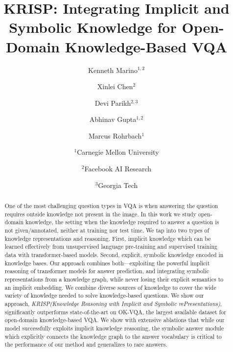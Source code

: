 \documentclass[final]{cvpr}
\providecommand{\ModelName}{KRISP\xspace}
\providecommand{\ModelNameLong}{Knowledge Reasoning with Implicit and  Symbolic rePresentations\xspace}
\providecommand{\sectionvspace}{\vspace{-0cm}}
\begin{document}
\title{KRISP: Integrating Implicit and Symbolic Knowledge for Open-Domain Knowledge-Based VQA}

\author{Kenneth Marino$^{1,2}$ \hspace{-.4cm} \\
\and
Xinlei Chen$^2$ \hspace{-.4cm} \\
\and
Devi Parikh$^{2,3}$ \hspace{-.4cm}\\
\and
Abhinav Gupta$^{1,2}$ \hspace{-.4cm}\\
\and
Marcus Rohrbach$^1$\\
\and
$^1$Carnegie Mellon University
\and
$^2$Facebook AI Research
\and
$^3$Georgia Tech
}
\maketitle

\begin{abstract}
    One of the most challenging question types in VQA is when  answering the question requires outside knowledge not present in the image. In this work we study open-domain knowledge, the setting when the knowledge required to answer a question is not given/annotated, neither at training nor test time. We tap into two types of knowledge representations and reasoning. First, implicit knowledge which can be learned effectively from unsupervised language pre-training and supervised training data with transformer-based models. Second, explicit, symbolic knowledge encoded in knowledge bases. Our approach combines both---exploiting the powerful implicit reasoning of transformer models for answer prediction, and integrating symbolic representations from a knowledge graph, while never losing their explicit semantics to an implicit embedding. We combine diverse sources of knowledge to cover the wide variety of knowledge needed to solve knowledge-based questions. We show our approach, \emph{\ModelName (\ModelNameLong)}, significantly outperforms state-of-the-art on OK-VQA, the largest available dataset for open-domain knowledge-based VQA. We show with extensive ablations that while our model successfully exploits implicit knowledge reasoning, the symbolic answer module which explicitly connects the knowledge graph to the answer vocabulary is critical to the performance of our method and generalizes to rare answers.
\end{abstract}


\vspace{-.3cm}
\sectionvspace
\end{document}
